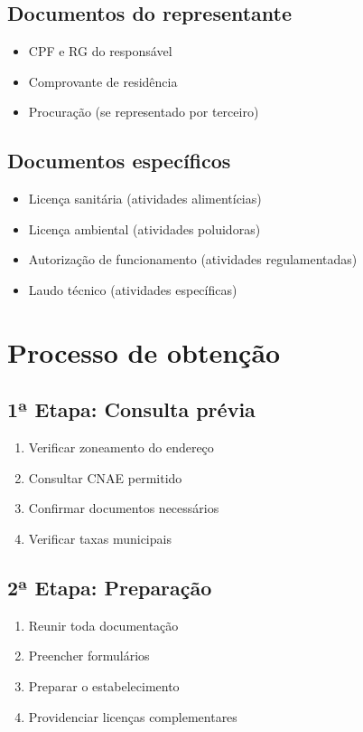 \documentclass[12pt,a4paper]{article}
\begin{document}
\subsection{Documentos do representante}
\begin{itemize}
    \item CPF e RG do responsável
    \item Comprovante de residência
    \item Procuração (se representado por terceiro)
\end{itemize}

\subsection{Documentos específicos}
\begin{itemize}
    \item Licença sanitária (atividades alimentícias)
    \item Licença ambiental (atividades poluidoras)
    \item Autorização de funcionamento (atividades regulamentadas)
    \item Laudo técnico (atividades específicas)
\end{itemize}

\section{Processo de obtenção}

\subsection{1ª Etapa: Consulta prévia}
\begin{enumerate}
    \item Verificar zoneamento do endereço
    \item Consultar CNAE permitido
    \item Confirmar documentos necessários
    \item Verificar taxas municipais
\end{enumerate}

\subsection{2ª Etapa: Preparação}
\begin{enumerate}
    \item Reunir toda documentação
    \item Preencher formulários
    \item Preparar o estabelecimento
    \item Providenciar licenças complementares
\end{enumerate}
\end{document}
